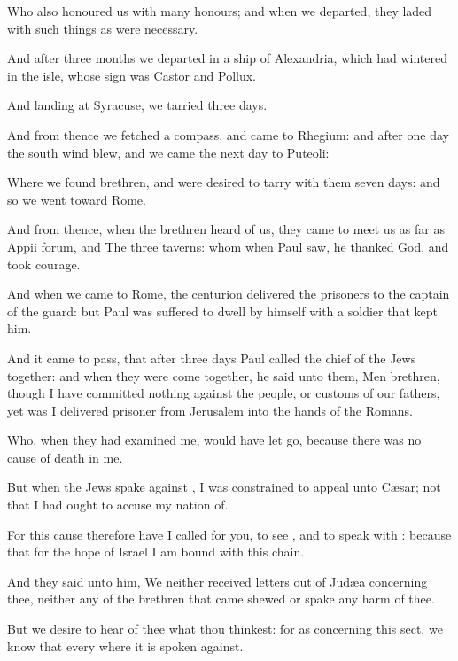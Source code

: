 {Who
also
honoured
us with
many
honours;
and when we
departed, they
laded
{} with such
things as
were
necessary.


\par }{\PP {}And
after
three
months we
departed
in a
ship of
Alexandria, which had
wintered
in the
isle, whose
sign was Castor and
Pollux.

And
landing
at
Syracuse, we
tarried
{}
three
days.

And from
thence we fetched a
compass, and
came
to
Rhegium:
and
after
one
day the south
wind
blew, and we
came the next
day
to
Puteoli:

Where we
found
brethren, and were
desired to
tarry
with
them
seven
days:
and
so we
went
toward
Rome.

And from
thence, when the
brethren
heard
of
us, they
came
to
meet
us as far
as
Appii
forum,
and The
three
taverns:
whom when
Paul
saw, he
thanked
God, and
took
courage.

And
when we
came
to
Rome, the
centurion
delivered the
prisoners to the captain of the
guard:
but
Paul was
suffered to
dwell
by
himself
with a
soldier that
kept
him.


\par }{\PP {}And it came to
pass, that
after
three
days
Paul
called the
chief of the
Jews
together:
and
when they
were come
together, he
said
unto
them,
Men
{}
brethren, though
I have
committed
nothing
against the
people,
or
customs of our
fathers, yet was I
delivered
prisoner
from
Jerusalem
into the
hands of the
Romans.

Who, when they had
examined
me, would
have
let
{}
go,
because there
was
no
cause of
death
in
me.

But when the
Jews spake
against
{}, I was
constrained to
appeal unto
Cæsar;
not
that I
had
ought to
accuse
my
nation
of.

For
this
cause
therefore have I
called for
you, to
see
{},
and to speak
with
{}: because
that
for the
hope of
Israel I am bound
with
this
chain.

And they
said
unto
him,
We
neither
received
letters
out of
Judæa
concerning
thee,
neither
any of the
brethren that
came
shewed
or
spake
any
harm
of
thee.

But we
desire to
hear
of
thee
what thou
thinkest:
for
as
concerning
this
sect,
we
know
that every
where it
is spoken
against.

}
